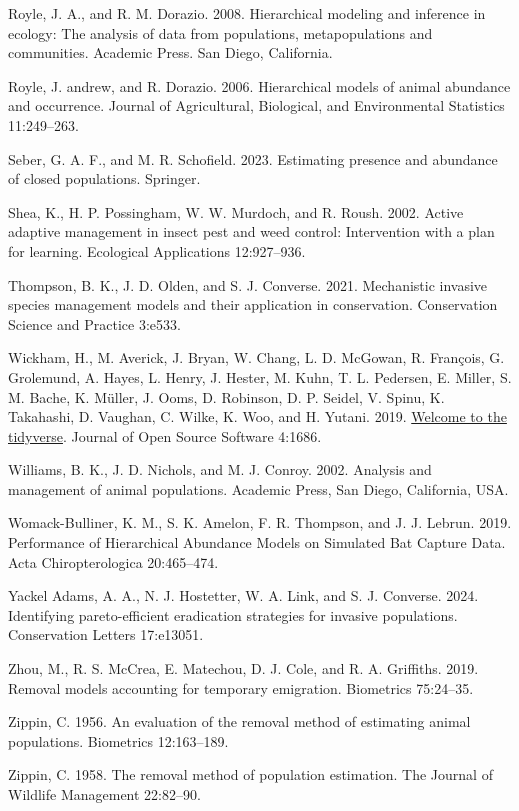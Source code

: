 \documentclass[
  11pt,
  a4paper,
]{article}
\newlength{\cslhangindent}
\newenvironment{CSLReferences}[2] %
 {\begin{list}{}{%
  \setlength{\itemindent}{0pt}
  \setlength{\leftmargin}{0pt}
  \setlength{\parsep}{0pt}
  \ifodd #1
   \setlength{\leftmargin}{\cslhangindent}
   \setlength{\itemindent}{-1\cslhangindent}
  \fi
  \setlength{\itemsep}{#2\baselineskip}}}
 {\end{list}}
\begin{document}
\begin{CSLReferences}{1}{0}
Royle, J. A., and R. M. Dorazio. 2008. Hierarchical modeling and inference in ecology: The analysis of data from populations, metapopulations and communities. Academic Press. San Diego, California.

Royle, J. andrew, and R. Dorazio. 2006. Hierarchical models of animal abundance and occurrence. Journal of Agricultural, Biological, and Environmental Statistics 11:249--263.

Seber, G. A. F., and M. R. Schofield. 2023. Estimating presence and abundance of closed populations. Springer.

Shea, K., H. P. Possingham, W. W. Murdoch, and R. Roush. 2002. Active adaptive management in insect pest and weed control: Intervention with a plan for learning. Ecological Applications 12:927--936.

Thompson, B. K., J. D. Olden, and S. J. Converse. 2021. Mechanistic invasive species management models and their application in conservation. Conservation Science and Practice 3:e533.

Wickham, H., M. Averick, J. Bryan, W. Chang, L. D. McGowan, R. François, G. Grolemund, A. Hayes, L. Henry, J. Hester, M. Kuhn, T. L. Pedersen, E. Miller, S. M. Bache, K. Müller, J. Ooms, D. Robinson, D. P. Seidel, V. Spinu, K. Takahashi, D. Vaughan, C. Wilke, K. Woo, and H. Yutani. 2019. \href{https://doi.org/10.21105/joss.01686}{Welcome to the {tidyverse}}. Journal of Open Source Software 4:1686.

Williams, B. K., J. D. Nichols, and M. J. Conroy. 2002. Analysis and management of animal populations. Academic Press, San Diego, California, USA.

Womack-Bulliner, K. M., S. K. Amelon, F. R. Thompson, and J. J. Lebrun. 2019. {Performance of Hierarchical Abundance Models on Simulated Bat Capture Data}. Acta Chiropterologica 20:465--474.

Yackel Adams, A. A., N. J. Hostetter, W. A. Link, and S. J. Converse. 2024. Identifying pareto-efficient eradication strategies for invasive populations. Conservation Letters 17:e13051.

Zhou, M., R. S. McCrea, E. Matechou, D. J. Cole, and R. A. Griffiths. 2019. Removal models accounting for temporary emigration. Biometrics 75:24--35.

Zippin, C. 1956. An evaluation of the removal method of estimating animal populations. Biometrics 12:163--189.

Zippin, C. 1958. The removal method of population estimation. The Journal of Wildlife Management 22:82--90.

\end{CSLReferences}
\end{document}
